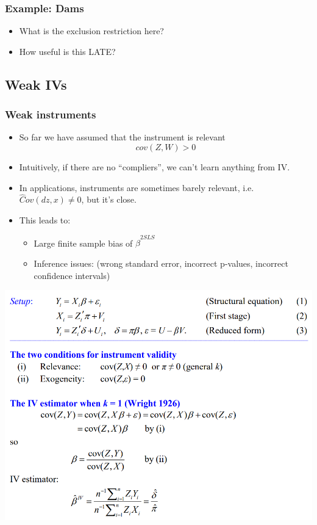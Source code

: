 \begin{frame}
  \frametitle{Example: Dams}
  \begin{itemize}
    \item What is the exclusion restriction here? 
    \item How useful is this LATE?
  \end{itemize}
\end{frame}

\subsection{Weak IVs}

\begin{frame}
  \frametitle{Weak instruments}
  \begin{itemize}
    \item So far we have assumed that the instrument is \alert{relevant}
    $$ cov(Z,W) > 0 $$
    \item Intuitively, if there are no ``compliers'', we can't learn anything from IV. 
    \item In applications, instruments are sometimes barely
    relevant, i.e. $\hat Cov( d z, x) \neq 0$, but it's close.
    \item This leads to: 
    \begin{itemize}
      \item Large finite sample bias of $\hat \beta^{2SLS}$
      \item Inference issues: 
    (wrong standard error, incorrect p-values, incorrect
    confidence intervals)
    \end{itemize} 
   \end{itemize}
\end{frame}

\begin{frame}{}
  \begin{center}
    \includegraphics[height=.8\textheight]{./resources/StockNBERIV}
  \end{center}  
\end{frame}


